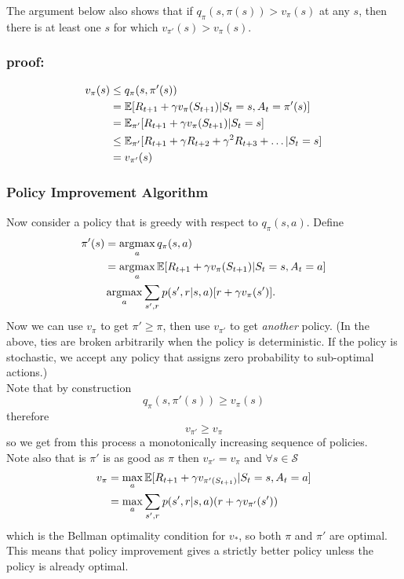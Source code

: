 The argument below also shows that if $q_\pi(s, \pi(s)) > v_\pi(s)$ at any $s$, then there is at least one $s$ for which $v_{\pi'}(s) > v_\pi(s)$.
\subsubsection*{proof:}
\begin{align*}
    v_\pi(s) & \leq q_\pi(s, \pi'(s)) \\
             & = \mathbb{E}{}[R_{t+1} + \gamma v_\pi(S_{t+1}) | S_t=s, A_t=\pi'(s)] \\
             & = \mathbb{E}{}_{\pi'} [R_{t+1} + \gamma v_\pi(S_{t+1}) | S_t=s] \\
             & \leq \mathbb{E}{}_{\pi'} [R_{t+1} + \gamma R_{t+2} + \gamma^2 R_{t+3} + \dots| S_t=s] \\
             & = v_{\pi'}(s)
\end{align*}

\subsubsection*{Policy Improvement Algorithm}
Now consider a policy that is greedy with respect to $q_\pi(s, a)$. Define 
\begin{align}
    \pi'(s) &= \operatorname*{argmax}_a q_\pi(s, a) \\ 
            &= \operatorname*{argmax}_a \mathbb{E}{} [R_{t+1} + \gamma v_\pi(S_{t+1}) | S_t=s, A_t=a] \\
            & \operatorname*{argmax}_a \sum_{s', r} p(s', r|s, a)[ r + \gamma v_\pi(s')].
\end{align}
Now we can use $v_\pi$ to get $\pi' \geq \pi$, then use $v_{\pi'}$ to get \emph{another} policy. (In the above, ties are broken arbitrarily when the policy is deterministic. If the policy is stochastic, we accept any policy that assigns zero probability to sub-optimal actions.)\\

Note that by construction
\[
    q_\pi(s, \pi'(s)) \geq v_\pi(s)
\]
therefore
\[
    v_{\pi'} \geq v_\pi
\]
so we get from this process a monotonically increasing sequence of policies.\\

Note also that is $\pi'$ is as good as $\pi$ then $v_{\pi'} = v_\pi$ and $\forall s \in \mathcal{S}$
\begin{align*}
    v_\pi &= \max_a \mathbb{E}{}[R_{t+1} + \gamma v_{\pi'(S_{t+1})}| S_t=s, A_t=a]\\
          &= \max_a \sum_{s', r} p(s', r|s, a)(r + \gamma v_{\pi'}(s'))
\end{align*}
which is the Bellman optimality condition for $v_*$, so both $\pi$ and $\pi'$ are optimal. This means that policy improvement gives a strictly better policy unless the policy is already optimal. \\

